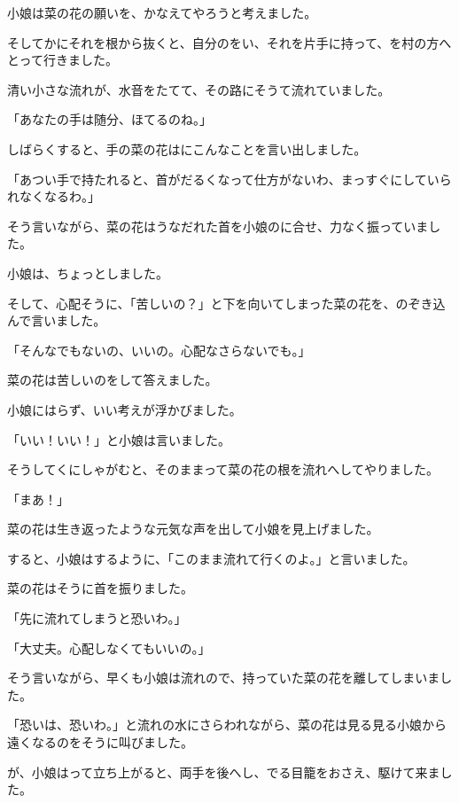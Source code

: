 小娘は菜の花の願いを、かなえてやろうと考えました。

そしてかにそれを根から抜くと、自分のをい、それを片手に持って、を村の方へとって行きました。



清い小さな流れが、水音をたてて、その路にそうて流れていました。

「あなたの手は随分、ほてるのね。」

しばらくすると、手の菜の花はにこんなことを言い出しました。

「あつい手で持たれると、首がだるくなって仕方がないわ、まっすぐにしていられなくなるわ。」

そう言いながら、菜の花はうなだれた首を小娘のに合せ、力なく振っていました。

小娘は、ちょっとしました。

そして、心配そうに、「苦しいの？」と下を向いてしまった菜の花を、のぞき込んで言いました。

「そんなでもないの、いいの。心配なさらないでも。」

菜の花は苦しいのをして答えました。

小娘にはらず、いい考えが浮かびました。

「いい！いい！」と小娘は言いました。

そうしてくにしゃがむと、そのままって菜の花の根を流れへしてやりました。

「まあ！」

菜の花は生き返ったような元気な声を出して小娘を見上げました。

すると、小娘はするように、「このまま流れて行くのよ。」と言いました。

菜の花はそうに首を振りました。

「先に流れてしまうと恐いわ。」

「大丈夫。心配しなくてもいいの。」

そう言いながら、早くも小娘は流れので、持っていた菜の花を離してしまいました。

「恐いは、恐いわ。」と流れの水にさらわれながら、菜の花は見る見る小娘から遠くなるのをそうに叫びました。

が、小娘はって立ち上がると、両手を後へし、でる目籠をおさえ、駆けて来ました。



